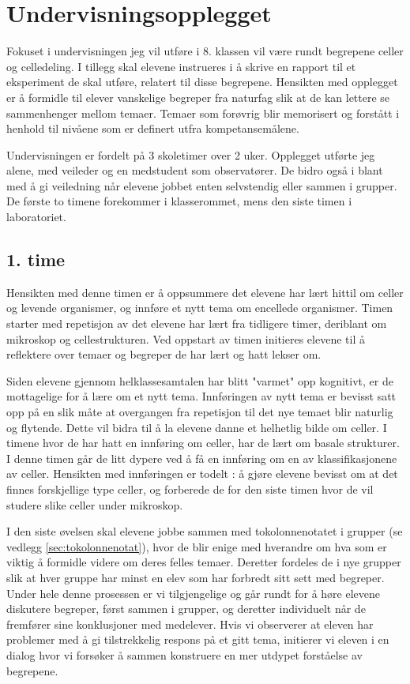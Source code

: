 \documentclass[main.tex]{subfiles}
\begin{document}
\section*{Undervisningsopplegget}
\label{sec:1}
Fokuset i undervisningen jeg vil utføre i 8. klassen vil være rundt begrepene celler og celledeling. 
I tillegg skal elevene instrueres i å skrive en rapport til et eksperiment de skal utføre, relatert til disse begrepene.
Hensikten med opplegget er å formidle til elever vanskelige begreper fra naturfag slik at de kan lettere 
se sammenhenger mellom temaer. Temaer som forøvrig blir memorisert og forstått i henhold til nivåene 
som er definert utfra kompetansemålene. 

Undervisningen er fordelt på 3 skoletimer over 2 uker. Opplegget utførte jeg alene, med veileder og en 
medstudent som observatører. De bidro også i blant med å gi veiledning når elevene jobbet enten 
selvstendig eller sammen i grupper. De første to timene forekommer i klasserommet, mens den siste timen 
i laboratoriet.

\subsection*{1. time}

Hensikten med denne timen er å oppsummere det elevene har lært hittil om celler og 
levende organismer, og innføre et nytt tema om encellede organismer. Timen starter med repetisjon 
av det elevene har lært fra tidligere timer, deriblant om mikroskop og cellestrukturen. Ved oppstart 
av timen initieres elevene til å reflektere over temaer og begreper de har lært og hatt lekser 
om.
 
Siden elevene gjennom helklassesamtalen har blitt "varmet" opp kognitivt, er de mottagelige for å 
lære om et nytt tema. Innføringen av nytt tema er bevisst satt opp på en slik måte at overgangen 
fra repetisjon til det nye temaet blir naturlig og flytende. Dette vil bidra til å la elevene danne et 
helhetlig bilde om celler. I timene hvor de har hatt en innføring om celler, har de lært om basale 
strukturer. I denne timen går de litt dypere ved å få en innføring om en av klassifikasjonene av celler.
Hensikten med innføringen er todelt : å gjøre elevene bevisst om at det finnes forskjellige type
celler, og forberede de for den siste timen hvor de vil studere slike celler under mikroskop.
 
I den siste øvelsen skal elevene jobbe sammen med tokolonnenotatet i grupper (se 
vedlegg \ref{sec:tokolonnenotat}), hvor de blir enige med hverandre om hva som er viktig å formidle videre 
om deres felles temaer. Deretter fordeles de i nye grupper slik at hver gruppe har minst en elev som har 
forbredt sitt sett med begreper. Under hele denne prosessen er vi tilgjengelige og går rundt for å 
høre elevene diskutere begreper, først sammen i grupper, og deretter individuelt når de fremfører sine 
konklusjoner med medelever. Hvis vi observerer at eleven har problemer med å gi tilstrekkelig 
respons på et gitt tema, initierer vi eleven i en dialog hvor vi forsøker å sammen konstruere en 
mer utdypet forståelse av begrepene. 
\end{document}
